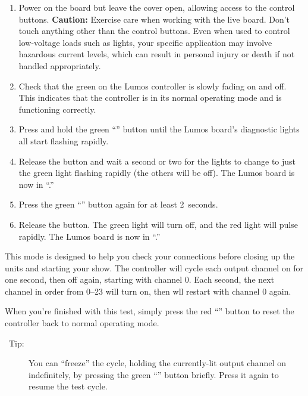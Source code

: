 \documentclass[letterpaper,twoside,onecolumn,openright,final]{memoir}
\begin{document}
\begin{enumerate}
	\item	Power on the board but leave the cover open, allowing access to the control buttons.
		{\bfseries Caution:} Exercise care when working with the live board.  Don't touch anything
		other than the control buttons.  Even when used  to control low-voltage loads such as 
		 lights, your specific application
		may involve hazardous current levels, which can result in personal injury or death if not
		handled appropriately.

	\item	Check that the green  on the Lumos controller is slowly fading on and off.  This indicates
		that the controller is in its normal operating mode and is functioning correctly.

	\item	Press and hold the green ``{}'' button until the Lumos board's diagnostic lights all start
		flashing rapidly.

	\item	Release the button and wait a second or two for the lights to change to just the green light
		flashing rapidly (the others will be off).  
		The Lumos board is now in ``.''

	\item	Press the green ``{}'' button again for at least 2~seconds.

	\item	Release the button.  The green light will turn off, and the red light will pulse rapidly.
		The Lumos board is now in ``.''
\end{enumerate}

This mode is designed to help you check your connections before closing up the units and starting your
show.  The controller will cycle each output channel on for one second, then off again, starting with channel 0.  
Each second, the next channel in order from 0--23 will turn on, then wll restart with channel 0 again.

When you're finished with this test, simply press the red ``'' button to reset the controller
back to normal operating mode.

\begin{description}
	\item[\HandRight\ Tip:]  You can ``freeze'' the cycle, holding the currently-lit
		output channel on indefinitely, by pressing the green ``'' button
		briefly.  Press it again to resume the test cycle.
\end{description}
\end{document}
